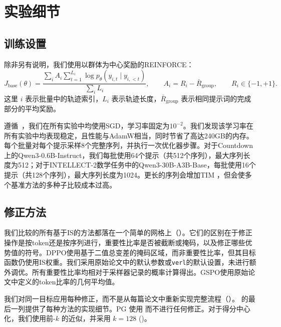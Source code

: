\section{实验细节}
\label{sec:experimental_details}

\subsection{训练设置}

除非另有说明，我们使用以群体为中心奖励的REINFORCE：
\begin{equation}
J_{\mathrm{base}}(\theta)
= \frac{\sum_i A_i \sum_{t=1}^{L_i} \log p_\theta(y_{i,t}\mid y_{i,<t})}
       {\sum_i L_i},
\qquad A_i = R_i - \bar R_{\mathrm{group}},
\qquad R_i \in \{-1,+1\}.
\label{eq:shared_reinforce}
\end{equation}
这里 $i$  表示批量中的轨迹索引，$L_i$  表示轨迹长度，$\bar R_{\mathrm{group}}$  表示相同提示词的完成部分的平均奖励。

遵循~\citet{rl_sgd}，我们在所有实验中均使用SGD，学习率固定为$10^{-2}$。我们发现该学习率在所有实验中均表现稳定，且性能与AdamW相当，同时节省了高达240GB的内存。每个批量对每个提示采样8个完整序列，并执行一次优化器步骤。对于Countdown上的Qwen3-0.6B-Instruct，我们每批使用64个提示（共512个序列），最大序列长度为512；对于INTELLECT-2数学任务中的Qwen3-30B-A3B-Base，每批使用16个提示（共128个序列），最大序列长度为1024。更长的序列会增加TIM \citep{jet_rl}，但会使多个基准方法的多种子比较成本过高。

\subsection{修正方法}
\label{sec:is_methods}

我们比较的所有基于IS的方法都落在一个简单的网格上（）。它们的区别在于修正操作是按token还是按序列进行，重要性比率是否被截断或掩码，以及修正哪些优势值的符号。DPPO使用基于二值总变差的掩码区域，而非重要性比率，但其目标函数仍使用IS权重。我们采用原始论文中的默认参数或\texttt{verl}的默认设置，未进行额外调优。所有重要性比率均相对于采样器记录的概率计算得出。GSPO使用原始论文中定义的token比率的几何平均值。

我们对同一目标应用每种修正，而不是从每篇论文中重新实现完整流程（）。 的最后一列提供了每种方法的实现细节。PG 使用  而不进行任何修正。对于得分中心化，我们使用前-$k$ 的近似，并采用 $k=128$  ()。

